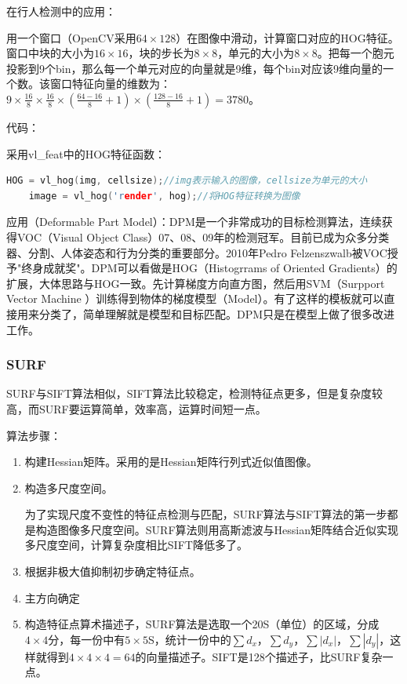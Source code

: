 \documentclass[12pt]{article}
\begin{document}
{\color{blue}在行人检测中的应用}：

用一个窗口（OpenCV采用$64 \times 128$）在图像中滑动，计算窗口对应的HOG特征。窗口中块的大小为$16 \times 16$，块的步长为$8 \times 8$，单元的大小为$8 \times 8$。把每一个胞元投影到9个bin，那么每一个单元对应的向量就是9维，每个bin对应该9维向量的一个数。该窗口特征向量的维数为：$9 \times \frac{16}{8} \times \frac{16}{8} \times (\frac{64-16}{8}+1) \times (\frac{128-16}{8}+1)=3780$。

{\color{blue}代码}：

采用vl\_feat中的HOG特征函数：
    \begin{lstlisting}[language=C++]
    HOG = vl_hog(img, cellsize);//img表示输入的图像，cellsize为单元的大小
    image = vl_hog('render', hog);//将HOG特征转换为图像
    \end{lstlisting}
    
{\color{blue}应用（Deformable Part Model）}：DPM是一个非常成功的目标检测算法，连续获得VOC（Visual Object Class）07、08、09年的检测冠军。目前已成为众多分类器、分割、人体姿态和行为分类的重要部分。2010年Pedro Felzenszwalb被VOC授予"终身成就奖"。DPM可以看做是HOG（Histogrrams of Oriented Gradients）的扩展，大体思路与HOG一致。先计算梯度方向直方图，然后用SVM（Surpport Vector Machine ）训练得到物体的梯度模型（Model）。有了这样的模板就可以直接用来分类了，简单理解就是模型和目标匹配。DPM只是在模型上做了很多改进工作。


  
\subsubsection{SURF}

SURF与SIFT算法相似，SIFT算法比较稳定，检测特征点更多，但是复杂度较高，而SURF要运算简单，效率高，运算时间短一点。

{\color{blue}算法步骤}：

\begin{enumerate}
\item 构建Hessian矩阵。采用的是Hessian矩阵行列式近似值图像。

\item 构造多尺度空间。

为了实现尺度不变性的特征点检测与匹配，SURF算法与SIFT算法的第一步都是构造图像多尺度空间。SURF算法则用高斯滤波与Hessian矩阵结合近似实现多尺度空间，计算复杂度相比SIFT降低多了。

\item 根据非极大值抑制初步确定特征点。

\item 主方向确定

\item 构造特征点算术描述子，SURF算法是选取一个20S（单位）的区域，分成$4 \times 4$分，每一份中有$5 \times 5$S，统计一份中的$\sum d_{x}$，$\sum d_{y}$，$\sum |d_{x}|$，$\sum |d_{y}|$，这样就得到$4 \times 4 \times 4 = 64$的向量描述子。SIFT是128个描述子，比SURF复杂一点。
\end{enumerate}
\end{document}
